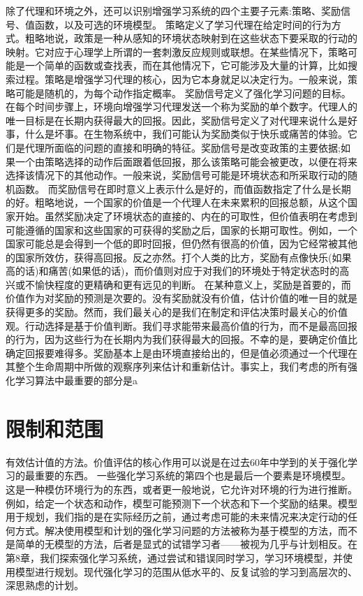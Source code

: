 除了代理和环境之外，还可以识别增强学习系统的四个主要子元素:策略、奖励信号、值函数，以及可选的环境模型。
策略定义了学习代理在给定时间的行为方式。粗略地说，政策是一种从感知的环境状态映射到在这些状态下要采取的行动的映射。它对应于心理学上所谓的一套刺激反应规则或联想。在某些情况下，策略可能是一个简单的函数或查找表，而在其他情况下，它可能涉及大量的计算，比如搜索过程。策略是增强学习代理的核心，因为它本身就足以决定行为。一般来说，策略可能是随机的，为每个动作指定概率。
奖励信号定义了强化学习问题的目标。在每个时间步骤上，环境向增强学习代理发送一个称为奖励的单个数字。代理人的唯一目标是在长期内获得最大的回报。因此，奖励信号定义了对代理来说什么是好事，什么是坏事。在生物系统中，我们可能认为奖励类似于快乐或痛苦的体验。它们是代理所面临的问题的直接和明确的特征。奖励信号是改变政策的主要依据;如果一个由策略选择的动作后面跟着低回报，那么该策略可能会被更改，以便在将来选择该情况下的其他动作。一般来说，奖励信号可能是环境状态和所采取行动的随机函数。
而奖励信号在即时意义上表示什么是好的，而值函数指定了什么是长期的好。粗略地说，一个国家的价值是一个代理人在未来累积的回报总额，从这个国家开始。虽然奖励决定了环境状态的直接的、内在的可取性，但价值表明在考虑到可能遵循的国家和这些国家的可获得的奖励之后，国家的长期可取性。例如，一个国家可能总是会得到一个低的即时回报，但仍然有很高的价值，因为它经常被其他的国家所效仿，获得高回报。反之亦然。打个人类的比方，奖励有点像快乐(如果高的话)和痛苦(如果低的话)，而价值则对应于对我们的环境处于特定状态时的高兴或不愉快程度的更精确和更有远见的判断。
在某种意义上，奖励是首要的，而价值作为对奖励的预测是次要的。没有奖励就没有价值，估计价值的唯一目的就是获得更多的奖励。然而，我们最关心的是我们在制定和评估决策时最关心的价值观。行动选择是基于价值判断。我们寻求能带来最高价值的行为，而不是最高回报的行为，因为这些行为在长期内为我们获得最大的回报。不幸的是，要确定价值比确定回报要难得多。奖励基本上是由环境直接给出的，但是值必须通过一个代理在其整个生命周期中所做的观察序列来估计和重新估计。事实上，我们考虑的所有强化学习算法中最重要的部分是a

\section{限制和范围}



有效估计值的方法。价值评估的核心作用可以说是在过去60年中学到的关于强化学习的最重要的东西。
一些强化学习系统的第四个也是最后一个要素是环境模型。这是一种模仿环境行为的东西，或者更一般地说，它允许对环境的行为进行推断。例如，给定一个状态和动作，模型可能预测下一个状态和下一个奖励的结果。模型用于规划，我们指的是在实际经历之前，通过考虑可能的未来情况来决定行动的任何方式。解决使用模型和计划的强化学习问题的方法被称为基于模型的方法，而不是简单的无模型的方法，后者是显式的试错学习者——被视为几乎与计划相反。在第8章，我们探索强化学习系统，通过尝试和错误同时学习，学习环境模型，并使用模型进行规划。现代强化学习的范围从低水平的、反复试验的学习到高层次的、深思熟虑的计划。

